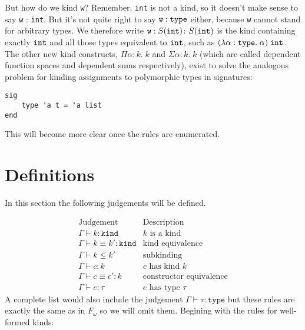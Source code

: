 \documentclass{article}
\newcommand{\type}{\ensuremath{\mathtt{type}}}
\newcommand{\kind}{\ensuremath{\mathtt{kind}}}
\begin{document}
But how do we kind \verb|w|? Remember, \verb|int| is not a kind, so it doesn't
make sense to say \verb|w| : \verb|int|. But it's not quite right to say
$\verb|w| : \type$ either, because \verb|w| cannot stand for arbitrary types. We
therefore write $\verb|w| : S(\verb|int|)$: $S(\verb|int|)$ is the kind
containing exactly $\verb|int|$ and all those types equivalent to $\verb|int|$,
such as $(\lambda \alpha : \type. \; \alpha) \; \verb|int|$. The other new kind
constructs, $\Pi \alpha : k. \; k$ and $\Sigma \alpha : k. \; k$ (which are
called dependent function spaces and dependent sums respectively), exist to
solve the analogous problem for kinding assignments to polymorphic types in
signatures:

\begin{verbatim}
sig
    type 'a t = 'a list
end
\end{verbatim}

This will become more clear once the rules are enumerated.


\section{Definitions}

In this section the following judgements will be defined.

\[
    \begin{array}{ll}
        \text{Judgement} & \text{Description} \\
        \hline
        \Gamma \vdash k : \kind & k \text{ is a kind} \\
        \Gamma \vdash k \equiv k' : \kind & \text{kind equivalence} \\
        \Gamma \vdash k \leq k' & \text{subkinding} \\
        \Gamma \vdash c : k & \text{$c$ has kind $k$} \\
        \Gamma \vdash c \equiv c' : k & \text{constructor equivalence} \\
        \Gamma \vdash e : \tau & \text{$e$ has type $\tau$}
    \end{array}
\]
A complete list would also include the judgement $\Gamma \vdash \tau : \type$
but these rules are exactly the same as in $F_\omega$ so we will omit them.
Begining with the rules for well-formed kinds:

\end{document}

